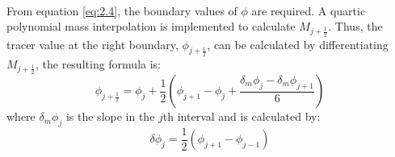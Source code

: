 \paragraph{} 
From equation \ref{eq:2.4}, the boundary values of $\phi$ are required. A quartic polynomial mass interpolation \citep{Colella1984} is implemented to calculate $M_{j+\frac{1}{2}}$. Thus, the tracer value at the right boundary, $\phi_{j+\frac{1}{2}}$, can be calculated by differentiating $M_{j+\frac{1}{2}} $, the resulting formula is:
\begin{equation} \label{eq:2.5} 
\phi_{j+\frac{1}{2}} = \phi_j + \frac{1}{2}(\phi_{j+1}-\phi_{j}+\frac{\delta_m \phi_j - \delta_m \phi_{j+1}}{6}) 
\end{equation} 
where $\delta_m \phi_j$ is the slope in the $j$th interval and is calculated by:
\begin{equation}
\delta \phi_j = \frac{1}{2}(\phi_{j+1} - \phi_{j-1})
\end{equation}
